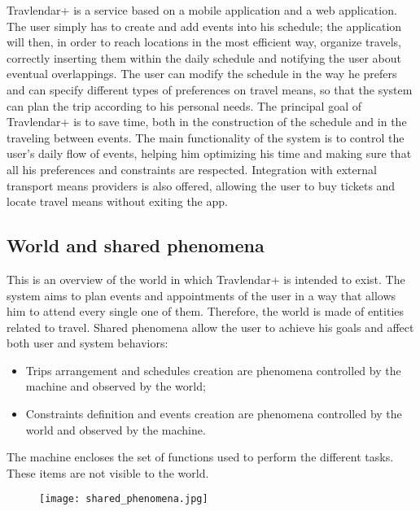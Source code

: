 Travlendar+ is a service based on a mobile application and a web application.
\newline
\newline
The user simply has to create and add events into his schedule; the application will then, in order to reach locations in the most efficient way, organize travels, correctly inserting them within the daily schedule and notifying the user about eventual overlappings. \newline
The user can modify the schedule in the way he prefers and can specify different types of preferences on travel means, so that the system can plan the trip according to his personal needs.
\newline
\newline
The principal goal of Travlendar+ is to save time, both in the construction of the schedule and in the traveling between events.
\newline
The main functionality of the system is to control the user's daily flow of events, helping him optimizing his time and making sure that all his preferences and constraints are respected.
\newline
Integration with external transport means providers is also offered, allowing the user to buy tickets and locate travel means without exiting the app.
\newline

\subsection{World and shared phenomena}
This is an overview of the world in which Travlendar+ is intended to exist.
\newline
The system aims to plan events and appointments of the user in a way that allows him to attend every single one of them. Therefore, the world is made of entities related to travel. 
\newline
\newline
Shared phenomena allow the user to achieve his goals and affect both user and system behaviors:
\begin{itemize}
	\item Trips arrangement and schedules creation are phenomena controlled by the machine and observed by the world;
	\item Constraints definition and events creation are phenomena controlled by the world and observed by the machine.
\end{itemize}
The machine encloses the set of functions used to perform the different tasks. These items are not visible to the world.
\newline
\begin{figure} [h]
\centering
\texttt{[image: shared\_phenomena.jpg]}
\end{figure}
